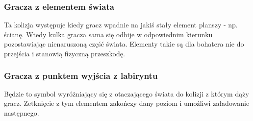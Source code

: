 \documentclass[12pt,a4paper,twoside]{article}
\begin{document}


\subsubsection{Gracza z elementem świata}
Ta kolizja występuje kiedy gracz wpadnie na jakiś stały element planszy - np. ścianę. Wtedy kulka gracza sama się odbije w odpowiednim kierunku pozostawiając nienaruszoną część świata. Elementy takie są dla bohatera nie do przejścia i stanowią fizyczną przeszkodę.

\subsubsection{Gracza z punktem wyjścia z labiryntu}
Będzie to symbol wyróżniający się z otaczającego świata do kolizji z którym dąży gracz. Zetknięcie z tym elementem zakończy dany poziom i umożliwi załadowanie następnego.

\end{document}
